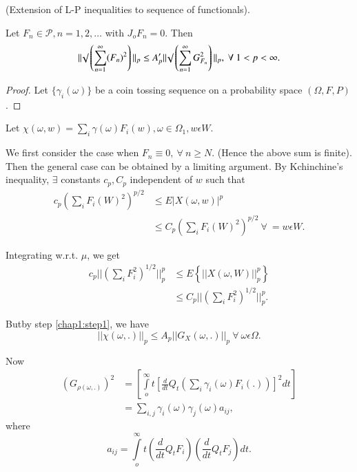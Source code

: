 \begin{step}\label{chap1:step3}%
  (Extension of L-P inequalities to sequence of functionals).

  Let $F_n \in \mathcal{P}, n=1,2, \ldots$ with $J_o F_n=0$. Then 
  $$
  || \surd \left(\sum^{\infty} _{{n=1}}(F_n)^2\right) ||_p \leq A'_p || \surd
  \left(\sum^{\infty} _{{n=1}} G^2_{F_n}\right) ||_p, ~\forall~ 1 < p < \infty. 
  $$
\end{step}

\begin{proof}
  Let $\{ \gamma _i (\omega)\}$ be a coin tossing sequence on a
  probability space $(\Omega, F, P)$. 
\end{proof}

Let $\chi (\omega,w) = \sum_i \gamma (\omega)F_i (w), \omega \in
\Omega_1, w \epsilon  W$. 

We first consider the case when $F_n \equiv 0, ~\forall~ n \geq
N$. (Hence the above sum is finite). Then the general case can be
obtained by a limiting argument. By Kchinchine's inequality, $\exists$
constants $c_p, C_p$ independent of $w$ such that 
\begin{align*}
  c_p \left(\sum_i F_i (W)^2\right)^{p/2}& \leq E|X(\omega,w)|^p\\
  &\leq C_p\left(\sum_i F_i (W)^2\right)^{p/2} ~\forall~ = w \epsilon  W.
\end{align*}

Integrating w.r.t. $\mu$, we get
\begin{align*}
  c_p || \left(\sum _i F^2_i\right)^{1/2} ||^p_p &\leq E \left\{ || X(\omega, W)
  ||^p_p \right\} \tag{1.15}\label{eq1.15}  \\ 
  &\leq C_p || \left(\sum _i F^2_i\right)^{1/2} ||_p^p.
\end{align*}

But\pageoriginale by step \ref{chap1:step1}, we have
\begin{equation*}
  || \chi (\omega, .) ||_p \leq A_p || G_X (\omega,.) ||_p ~\forall~
  \omega \epsilon  \Omega . \tag{1.16}\label{eq1.16} 
\end{equation*}

Now
\begin{align*}
  (G_{\rho (\omega,.)})^2 &= \left[\int \limits^\infty _o t
    \left[\frac{d}{dt}Q_t \left(\sum_i \gamma_i (\omega )F_i
      (.)\right)\right]^2 dt\right]\\  
  &= \sum_{i, j} \gamma _i (\omega )\gamma_j (\omega )a_{ij},
\end{align*}
where
$$
a_{i j}= \int\limits^\infty _o t \left(\frac{d}{dt} Q_t F_i\right)
\left(\frac{d}{dt} Q_t F_j\right) dt.
$$

